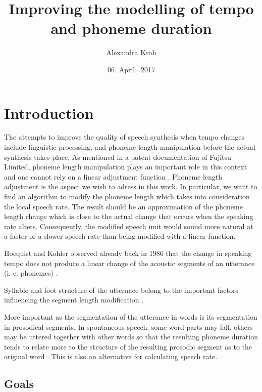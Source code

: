 \documentclass[a4paper]{scrreprt}
\begin{document}
\title{Improving the modelling of tempo and phoneme duration}
\author{Alexandra Krah}
\date{06. April ~2017}
\maketitle
\chapter*{}
\tableofcontents

\chapter{Introduction}
The attempts to improve the quality of speech synthesis when tempo changes include linguistic processing, and phoneme length manipulation before the actual synthesis takes place. As mentioned in a patent documentation of Fujitsu Limited, phoneme length manipulation plays an important role in this context and one cannot rely on a linear adjustment function \cite{nishiike2008}. Phoneme length adjustment is the aspect we wish to adress in this work. In particular, we want to find an algorithm to modify the phoneme length which takes into consideration the local speech rate. The result should be an approximation of the phoneme length change which is close to the actual change that occurs when the speaking rate alters. Consequently, the modified speech unit would sound more natural at a faster or a slower speech rate than being modified with a linear function.

Hoequist and Kohler observed already back in 1986 that the change in speaking tempo does not produce a linear change of the acoustic segments of an utterance (i. e. phonemes) \cite{Hoequist1986}. 

Syllable and foot structure of the utternace belong to the important factors influencing the segment length modification  \cite{Hoequist1986}.

More important as the segmentation of the utterance in words is its segmentation in prosodical segments. In spontaneous speech, some word parts may fall, others may be uttered together with other words so that the resulting phoneme duration tends to relate more to the structure of the resulting prosodic segment as to the original word \cite{Kohler1986}. This is also an alternative for calculating speech rate.
\section{Goals}
\end{document}

